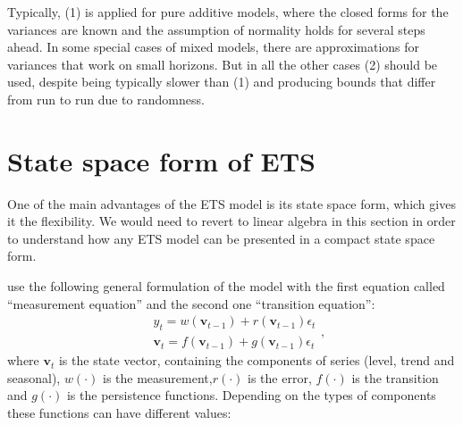 \documentclass[
]{book}
\theoremstyle{definition}
\theoremstyle{definition}
\theoremstyle{definition}
\theoremstyle{definition}
\theoremstyle{remark}
\begin{document}
Typically, (1) is applied for pure additive models, where the closed forms for the variances are known and the assumption of normality holds for several steps ahead. In some special cases of mixed models, there are approximations for variances that work on small horizons. But in all the other cases (2) should be used, despite being typically slower than (1) and producing bounds that differ from run to run due to randomness.

\hypertarget{ETSConventionalModel}{%
\section{State space form of ETS}\label{ETSConventionalModel}}

One of the main advantages of the ETS model is its state space form, which gives it the flexibility. We would need to revert to linear algebra in this section in order to understand how any ETS model can be presented in a compact state space form.

\citet{Hyndman2008b} use the following general formulation of the model with the first equation called ``measurement equation'' and the second one ``transition equation'':
\begin{equation}
  \begin{aligned}
  & {y}_{t} = w(\mathbf{v}_{t-1}) + r(\mathbf{v}_{t-1}) \epsilon_t \\
  & \mathbf{v}_{t} = f(\mathbf{v}_{t-1}) + g(\mathbf{v}_{t-1}) \epsilon_t
  \end{aligned},
  \label{eq:ETSConventionalStateSpace}
\end{equation}
where \(\mathbf{v}_t\) is the state vector, containing the components of series (level, trend and seasonal), \(w(\cdot)\) is the measurement,\(r(\cdot)\) is the error, \(f(\cdot)\) is the transition and \(g(\cdot)\) is the persistence functions. Depending on the types of components these functions can have different values:
\end{document}
